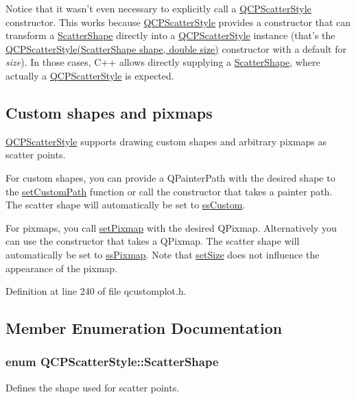 Notice that it wasn't even necessary to explicitly call a \hyperlink{class_q_c_p_scatter_style}{Q\-C\-P\-Scatter\-Style} constructor. This works because \hyperlink{class_q_c_p_scatter_style}{Q\-C\-P\-Scatter\-Style} provides a constructor that can transform a \hyperlink{class_q_c_p_scatter_style_adb31525af6b680e6f1b7472e43859349}{Scatter\-Shape} directly into a \hyperlink{class_q_c_p_scatter_style}{Q\-C\-P\-Scatter\-Style} instance (that's the \hyperlink{class_q_c_p_scatter_style_a003d92f74f4561eda111862eadd62f28}{Q\-C\-P\-Scatter\-Style(\-Scatter\-Shape shape, double size)} constructor with a default for {\itshape size}). In those cases, C++ allows directly supplying a \hyperlink{class_q_c_p_scatter_style_adb31525af6b680e6f1b7472e43859349}{Scatter\-Shape}, where actually a \hyperlink{class_q_c_p_scatter_style}{Q\-C\-P\-Scatter\-Style} is expected.\hypertarget{class_q_c_p_scatter_style_QCPScatterStyle-custompath-and-pixmap}{}\subsection{Custom shapes and pixmaps}\label{class_q_c_p_scatter_style_QCPScatterStyle-custompath-and-pixmap}
\hyperlink{class_q_c_p_scatter_style}{Q\-C\-P\-Scatter\-Style} supports drawing custom shapes and arbitrary pixmaps as scatter points.

For custom shapes, you can provide a Q\-Painter\-Path with the desired shape to the \hyperlink{class_q_c_p_scatter_style_a96a3e949f90b2afe5677ca9412a12a1e}{set\-Custom\-Path} function or call the constructor that takes a painter path. The scatter shape will automatically be set to \hyperlink{class_q_c_p_scatter_style_adb31525af6b680e6f1b7472e43859349a15d9bcfd9de94edda949006529f9219d}{ss\-Custom}.

For pixmaps, you call \hyperlink{class_q_c_p_scatter_style_a5fb611d46acfac520d7b89a1c71d9246}{set\-Pixmap} with the desired Q\-Pixmap. Alternatively you can use the constructor that takes a Q\-Pixmap. The scatter shape will automatically be set to \hyperlink{class_q_c_p_scatter_style_adb31525af6b680e6f1b7472e43859349a8718b849ca7c307b07b8e091efb0c31e}{ss\-Pixmap}. Note that \hyperlink{class_q_c_p_scatter_style_aaefdd031052892c4136129db68596e0f}{set\-Size} does not influence the appearance of the pixmap. 

Definition at line 240 of file qcustomplot.\-h.



\subsection{Member Enumeration Documentation}
\hypertarget{class_q_c_p_scatter_style_adb31525af6b680e6f1b7472e43859349}{
\subsubsection[{Scatter\-Shape}]{\setlength{\rightskip}{0pt plus 5cm}enum {\bf Q\-C\-P\-Scatter\-Style\-::\-Scatter\-Shape}}}\label{class_q_c_p_scatter_style_adb31525af6b680e6f1b7472e43859349}
Defines the shape used for scatter points.

